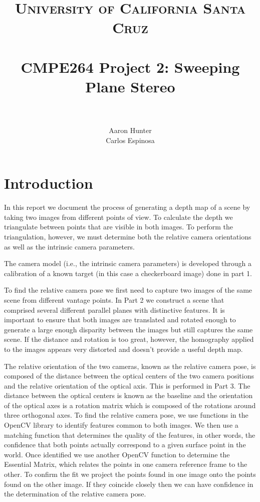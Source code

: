 \documentclass[a4paper]{article}
\title{
		\vspace{-0.6in} 	
		\usefont{OT1}{bch}{b}{n}
		\normalfont \normalsize \textsc{University of California Santa Cruz} \\ [10pt]
		\horrule{0.5pt} \\[0.4cm]
		\huge CMPE264 Project 2: Sweeping Plane Stereo \\
		\horrule{2pt} \\[0.5cm]
}
\author{
		\normalfont 								
        Aaron Hunter\\  Carlos Espinosa\\[-3pt]		\normalsize
}
\begin{document}
\maketitle
\section{Introduction}
In this report we document the process of generating a depth map of a scene by taking two images from different points of view.  To calculate the depth we triangulate between points that are visible in both images.  To perform the triangulation, however, we must determine both the relative camera orientations as well as the intrinsic camera parameters.  

The camera model (i.e., the intrinsic camera parameters) is developed through a calibration of a known target (in this case a checkerboard image) done in part 1. 

To find the relative camera pose we first need to capture two images of the same scene from different vantage points.  In Part 2 we construct a scene that comprised several different parallel planes with distinctive features. It is important to ensure that both images are translated and rotated enough to generate a large enough disparity between the images but still captures the same scene.  If the distance and rotation is too great, however, the homography applied to the images appears very distorted and doesn't provide a useful depth map.  

The relative orientation of the two cameras, known as the relative camera pose, is composed of the distance between the optical centers of the two camera positions and the relative orientation of the optical axis. This is performed in Part 3. The distance between the optical centers is known as the baseline and the orientation of the optical axes is a rotation matrix which is composed of the rotations around three orthogonal axes. To find the relative camera pose, we use functions in the OpenCV library to identify features common to both images.  We then use a matching function that determines the quality of the features, in other words, the confidence that both points actually correspond to a given surface point in the world.  Once identified we use another OpenCV function to determine the Essential Matrix, which relates the points in one camera reference frame to the other.  To confirm the fit we project the points found in one image onto the points found on the other image. If they coincide closely then we can have confidence in the determination of the relative camera pose.  
\end{document}
